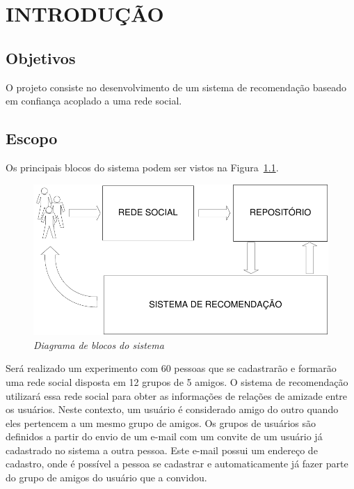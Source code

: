 \chapter{INTRODUÇÃO} 

\section{Objetivos} %

 O projeto consiste no desenvolvimento de um sistema de recomendação baseado em confiança acoplado a uma rede social.

\section{Escopo}

 Os principais blocos do sistema podem ser vistos na Figura~\ref{fig:escopo}.

\begin{figure}
  \centering
  \includegraphics[width=\textwidth]{imagens/Diagrama_Visao_Geral}
  \caption{\it Diagrama de blocos do sistema}
  \label{fig:escopo}
\end{figure}

 Será realizado um experimento com 60 pessoas que se cadastrarão e formarão uma rede social disposta em 12 grupos de 5 amigos. O sistema de recomendação utilizará essa rede social para obter as informações de relações de amizade entre os usuários. Neste contexto, um usuário é considerado amigo do outro quando eles pertencem a um mesmo grupo de amigos. Os grupos de usuários são definidos a partir do envio de um e-mail com um convite de um usuário já cadastrado no sistema a outra pessoa. Este e-mail possui um endereço de cadastro, onde é possível a pessoa se cadastrar e automaticamente já fazer parte do grupo de amigos do usuário que a convidou.

